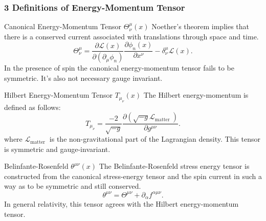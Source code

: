 \documentclass[11pt, xcolor=dvipsnames]{beamer}
\begin{document}
\begin{frame}
\frametitle{3 Definitions of Energy-Momentum Tensor}
\begin{block}{Canonical Energy-Momentum Tensor \(\Theta_{\nu}^{\mu}(x)\)}
	Noether's theorem implies that there is a conserved current associated with translations through space and time.
	\begin{equation}
\Theta_{\nu}^{\mu}=\frac{\partial \mathcal{L}(x)}{\partial\left(\partial_{\mu} \phi_{n}\right)} \frac{\partial \phi_{n}(x)}{\partial x^{\nu}}-\delta_{\nu}^{\mu} \mathcal{L}(x).
\end{equation}
	   In the presence of spin the canonical energy-momentum tensor fails to be symmetric. It's also not necessary gauge invariant.
\end{block}
\begin{alertblock}{Hilbert Energy-Momentum Tensor \(T_{\mu}_{\nu}(x)\)}
The Hilbert energy-momentum is defined as follows:
\begin{equation}
T_{\mu}_{\nu}=\frac{-2}{\sqrt{-g}} \frac{\partial\left(\sqrt{-g} \mathcal{L}_{\text {matter }}\right)}{\partial g^{\mu \nu}}.
\end{equation}
where \(\mathcal{L}_{\text {matter }}\) is the non-gravitational part of the Lagrangian density. This tensor is symmetric and gauge-invariant.
\end{alertblock}
\begin{exampleblock}{Belinfante-Rosenfeld \(\theta^{\mu \nu}(x)\)}
	 The Belinfante-Rosenfeld stress energy tensor is constructed from the canonical stress-energy tensor and the spin current in such a way as to be symmetric and still conserved. 
	 \begin{equation}
\theta^{\mu \nu}=\Theta^{\mu \nu}+\partial_{\alpha} f^{\alpha \mu \nu}.
\end{equation}
	 In general relativity, this tensor agrees with the Hilbert energy-momentum tensor.
\end{exampleblock}
\end{frame}

\end{document}
